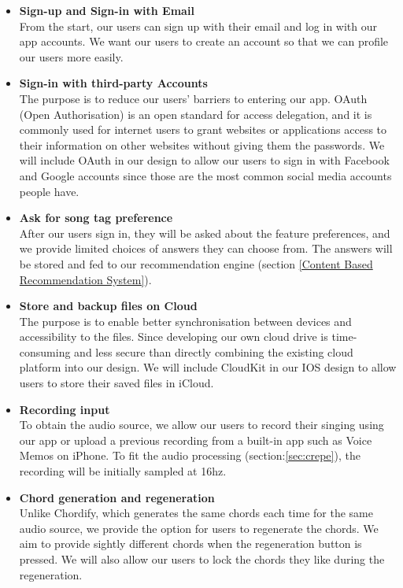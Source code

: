 \begin{itemize}

\item \textbf{Sign-up and Sign-in with Email}
\\From the start, our users can sign up with their email and log in with our app accounts. We want our users to create an account so that we can profile our users more easily.

\item \textbf{Sign-in with third-party Accounts}
\\ The purpose is to reduce our users' barriers to entering our app. OAuth (Open Authorisation) is an open standard for access delegation, and it is commonly used for internet users to grant websites or applications access to their information on other websites without giving them the passwords. We will include OAuth in our design to allow our users to sign in with Facebook and Google accounts since those are the most common social media accounts people have.

\item \textbf{Ask for song tag preference}
\\After our users sign in, they will be asked about the feature preferences, and we provide limited choices of answers they can choose from. The answers will be stored and fed to our recommendation engine (section \ref{Content Based Recommendation System}).

\item \textbf{Store and backup files on Cloud}
\\The purpose is to enable better synchronisation between devices and accessibility to the files. Since developing our own cloud drive is time-consuming and less secure than directly combining the existing cloud platform into our design. 
We will include CloudKit in our IOS design to allow users to store their saved files in iCloud.

\item \textbf{Recording input}
\\ To obtain the audio source, we allow our users to record their singing using our app or upload a previous recording 
from a built-in app such as Voice Memos on iPhone. To fit the audio processing (section:\ref{sec:crepe}), the recording will be initially sampled at 16hz.

\item \textbf{Chord generation and regeneration}
\\Unlike Chordify, which generates the same chords each time for the same audio source, we provide the option for users to regenerate the chords. We aim to provide sightly different chords when the regeneration button is pressed. 
We will also allow our users to lock the chords they like during the regeneration.


\end{itemize}
